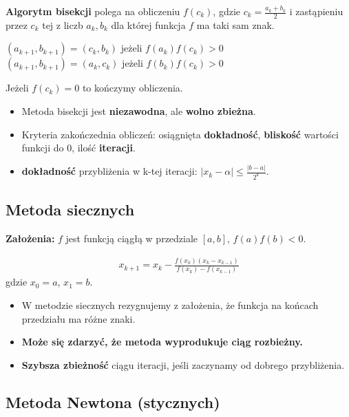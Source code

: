 \documentclass[main.tex]{subfiles}
\begin{document}
    \begin{definition}
        \textbf{Algorytm bisekcji} polega na obliczeniu $f(c_k)$, gdzie $c_k = \frac{a_k + b_k}{2}$ i zastąpieniu przez
        $c_k$ tej z liczb $a_k, b_k$ dla której funkcja $f$ ma taki sam znak.
        \begin{center}
            $(a_{k+1}, b_{k+1}) = (c_k, b_k)$ jeżeli $f(a_k)f(c_k) > 0$\\
            $(a_{k+1}, b_{k+1}) = (a_k, c_k)$ jeżeli $f(b_k)f(c_k) > 0$
        \end{center}
        Jeżeli $f(c_k) = 0$ to kończymy obliczenia.
    \end{definition}
    \begin{itemize}
        \item Metoda bisekcji jest \textbf{niezawodna}, ale \textbf{wolno zbieżna}.
        \item Kryteria zakończednia obliczeń: osiągnięta \textbf{dokładność}, \textbf{bliskość} wartości funkcji do 0,
        ilość \textbf{iteracji}.
        \item \textbf{dokładność} przybliżenia w k-tej iteracji: $|x_k - \alpha| \leq \frac{|b - a|}{2^k}$.
    \end{itemize}


    \subsection{Metoda siecznych}

    \textbf{Założenia:} $f$ jest funkcją ciągłą w przedziale $[a,b]$, $f(a)f(b) < 0$.

    \begin{align*}
        x_{k+1} = x_k - \frac{f(x_k)(x_k - x_{k-1})}{f(x_k) - f(x_{k-1})}
    \end{align*}
    gdzie $x_0 = a$, $x_1 = b$.

    \begin{itemize}
        \item W metodzie siecznych rezygnujemy z założenia, że funkcja na końcach przedziału ma różne znaki.
        \item \textbf{Może się zdarzyć, że metoda wyprodukuje ciąg rozbieżny.}
        \item \textbf{Szybsza zbieżność} ciągu iteracji, jeśli zaczynamy od dobrego przybliżenia.
    \end{itemize}

    \subsection{Metoda Newtona (stycznych)}
\end{document}
